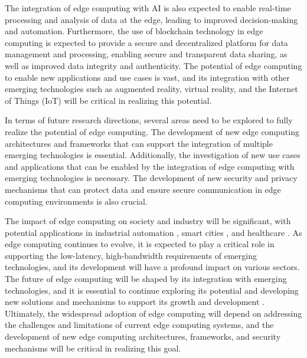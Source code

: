 \documentclass[11pt]{article}
\begin{document}
The integration of edge computing with AI \cite{ref6} is also expected to enable real-time processing and analysis of data at the edge, leading to improved decision-making and automation. Furthermore, the use of blockchain technology \cite{ref67} in edge computing is expected to provide a secure and decentralized platform for data management and processing, enabling secure and transparent data sharing, as well as improved data integrity and authenticity. The potential of edge computing to enable new applications and use cases is vast, and its integration with other emerging technologies such as augmented reality, virtual reality, and the Internet of Things (IoT) \cite{ref3} will be critical in realizing this potential.

In terms of future research directions, several areas need to be explored to fully realize the potential of edge computing. The development of new edge computing architectures and frameworks that can support the integration of multiple emerging technologies \cite{ref68} is essential. Additionally, the investigation of new use cases and applications that can be enabled by the integration of edge computing with emerging technologies \cite{ref69} is necessary. The development of new security and privacy mechanisms that can protect data and ensure secure communication in edge computing environments \cite{ref70} is also crucial.

The impact of edge computing on society and industry will be significant, with potential applications in industrial automation \cite{ref71}, smart cities \cite{ref17}, and healthcare \cite{ref72}. As edge computing continues to evolve, it is expected to play a critical role in supporting the low-latency, high-bandwidth requirements of emerging technologies, and its development will have a profound impact on various sectors. The future of edge computing will be shaped by its integration with emerging technologies, and it is essential to continue exploring its potential and developing new solutions and mechanisms to support its growth and development \cite{ref73}. Ultimately, the widespread adoption of edge computing will depend on addressing the challenges and limitations of current edge computing systems, and the development of new edge computing architectures, frameworks, and security mechanisms will be critical in realizing this goal.
\end{document}
